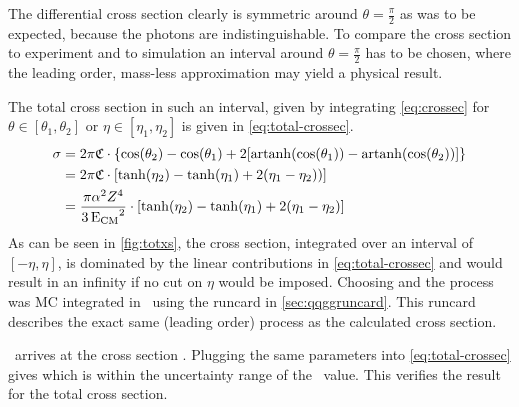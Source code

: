 The differential cross section clearly is symmetric around
\(\theta=\frac{\pi}{2}\) as was to be expected, because the photons
are indistinguishable. To compare the cross section to experiment and
to simulation an interval around \(\theta=\frac{\pi}{2}\) has to be
chosen, where the leading order, mass-less approximation may yield a
physical result.

The total cross section in such an interval, given by
integrating \cref{eq:crossec} for \(\theta\in [\theta_1, \theta_2]\)
or \(\eta\in [\eta_1, \eta_2]\) is given
in \cref{eq:total-crossec}.
%
\begin{equation}
  \label{eq:total-crossec}
  \begin{split}
  \sigma &=
  2\pi\mathfrak{C}\cdot\qty{\cos(\theta_2)-\cos(\theta_1)+2\qty[\operatorname{artanh}(\cos(\theta_1))
    - \operatorname{artanh}(\cos(\theta_2))]} \\
  &=2\pi\mathfrak{C}\cdot\qty[\tanh(\eta_2) - \tanh(\eta_1) + 2(\eta_1
  - \eta_2))] \\
  &={\frac{\pi\alpha^2Z^4}{3\operatorname{E_{\text{CM}}}^2}}\cdot\qty[\tanh(\eta_2) - \tanh(\eta_1) + 2(\eta_1
  - \eta_2)]
  \end{split}
\end{equation}
%
As can be seen in \cref{fig:totxs}, the cross section, integrated over
an interval of \([-\eta, \eta]\), is dominated by the linear
contributions in \cref{eq:total-crossec} and would result in an
infinity if no cut on \(\eta\) would be imposed. Choosing
 and  the
process was MC integrated in \sherpa\ using the runcard in
\cref{sec:qqggruncard}. This runcard describes the exact same (leading
order) process as the calculated cross section.

\sherpa\ arrives at the cross section
. Plugging the same parameters into
\cref{eq:total-crossec} gives  which is within
the uncertainty range of the \sherpa\ value. This verifies the result
for the total cross section.

